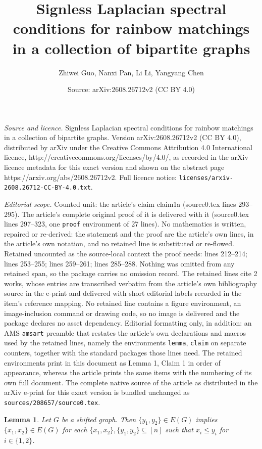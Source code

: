 \documentclass[10pt,a4paper]{amsart}
\title{Signless Laplacian spectral conditions for rainbow matchings in a collection of bipartite graphs}
\author{Zhiwei Guo, Nanxi Pan, Li Li, Yangyang Chen}
\date{Source: arXiv:2608.26712v2 (CC BY 4.0)}
\newtheorem{lemma}{Lemma}
\begin{document}
\maketitle

\noindent\emph{Source and licence.} Signless Laplacian spectral conditions for rainbow matchings in a collection of bipartite graphs. Version arXiv:2608.26712v2 (CC BY 4.0), distributed by arXiv under the Creative Commons Attribution 4.0 International licence, http://creativecommons.org/licenses/by/4.0/, as recorded in the arXiv licence metadata for this exact version and shown on the abstract page https://arxiv.org/abs/2608.26712v2. Full licence notice: \texttt{licenses/arxiv-2608.26712-CC-BY-4.0.txt}.\par\smallskip

\noindent\textit{Editorial scope.} Counted unit: the article's claim claim1a (source0.tex lines 293--295). The article's complete original proof of it is delivered with it (source0.tex lines 297--323, one \texttt{proof} environment of 27 lines). No mathematics is written, repaired or re-derived: the statement and the proof are the article's own lines, in the article's own notation, and no retained line is substituted or re-flowed.  Retained uncounted as the source-local context the proof needs: lines 212--214; lines 253--255; lines 259--261; lines 285--288.  Nothing was omitted from any retained span, so the package carries no omission record.  The retained lines cite 2 works, whose entries are transcribed verbatim from the article's own bibliography source in the e-print and delivered with short editorial labels recorded in the item's reference mapping.  No retained line contains a figure environment, an image-inclusion command or drawing code, so no image is delivered and the package declares no asset dependency.  Editorial formatting only, in addition: an AMS \texttt{amsart} preamble that restates the article's own declarations and macros used by the retained lines, namely the environments \texttt{lemma}, \texttt{claim} on separate counters, together with the standard packages those lines need.  The retained environments print in this document as Lemma 1, Claim 1 in order of appearance, whereas the article prints the same items with the numbering of its own full document.  The complete native source of the article as distributed in the arXiv e-print for this exact version is bundled unchanged as \texttt{sources/208657/source0.tex}.
\begin{lemma}\label{lemma3b}
Let $G$ be a shifted graph. Then $\{{{y_1},{y_2}}\}\in E(G)$ implies $\{ {{x_1},{x_2}}\} \in E(G)$ for each $\{{{x_1},{x_2}}\},\{{{y_1},{y_2}}\} \subseteq [n]$ such that ${x_i}\le {y_i}$ for $i \in \{1,2\}$.
\end{lemma}
\end{document}
